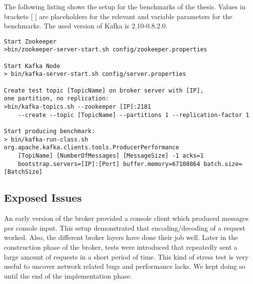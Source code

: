 The following listing shows the setup for the benchmarks of the thesis. Values
in brackets [ ] are placeholders for the relevant and variable parameters for the
benchmarks. The used version of Kafka is 2.10-0.8.2.0. 

\begin{verbatim}
Start Zookeeper
>bin/zookeeper-server-start.sh config/zookeeper.properties

Start Kafka Node 
> bin/kafka-server-start.sh config/server.properties

Create test topic [TopicName] on broker server with [IP], 
one partition, no replication: 
>bin/kafka-topics.sh --zookeeper [IP]:2181 
    --create --topic [TopicName] --partitions 1 --replication-factor 1

Start producing benchmark: 
> bin/kafka-run-class.sh org.apache.kafka.clients.tools.ProducerPerformance 
    [TopiName] [NumberOfMessages] [MessageSize] -1 acks=1 
    bootstrap.servers=[IP]:[Port] buffer.memory=67108864 batch.size=[BatchSize]
\end{verbatim}





\newpage
\subsection{Exposed Issues}

An early version of the broker provided a console client which produced messages
per console input. This setup demonstrated that encoding/decoding of a request
worked. Also, the different broker layers have done their job well.  Later in
the construction phase of the broker, tests were introduced that repeatedly sent
a large amount of requests in a short period of time. This kind of stress test
is very useful to uncover network related bugs and performance lacks. We kept
doing so until the end of the implementation phase.

